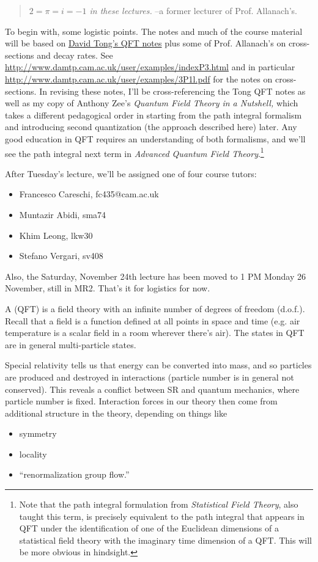 \begin{quote}\textit{$2=\pi=i=-1$ in these lectures.} --a former lecturer of Prof. Allanach's.\end{quote}
To begin with, some logistic points. The notes and much of the course material will be based on \href{http://www.damtp.cam.ac.uk/user/tong/qft/qft.pdf}{David Tong's QFT notes} plus some of Prof. Allanach's on cross-sections and decay rates. See \url{http://www.damtp.cam.ac.uk/user/examples/indexP3.html} and in particular \url{http://www.damtp.cam.ac.uk/user/examples/3P1l.pdf} for the notes on cross-sections. In revising these notes, I'll be cross-referencing the Tong QFT notes as well as my copy of Anthony Zee's \textit{Quantum Field Theory in a Nutshell,} which takes a different pedagogical order in starting from the path integral formalism and introducing second quantization (the approach described here) later. Any good education in QFT requires an understanding of both formalisms, and we'll see the path integral next term in \emph{Advanced Quantum Field Theory}.\footnote{Note that the path integral formulation from \emph{Statistical Field Theory}, also taught this term, is precisely equivalent to the path integral that appears in QFT under the identification of one of the Euclidean dimensions of a statistical field theory with the imaginary time dimension of a QFT. This will be more obvious in hindsight.}

After Tuesday's lecture, we'll be assigned one of four course tutors:
\begin{itemize}
    \item Francesco Careschi, fc435@cam.ac.uk
    \item Muntazir Abidi, sma74
    \item Khim Leong, lkw30
    \item Stefano Vergari, sv408
\end{itemize}
Also, the Saturday, November 24th lecture has been moved to 1 PM Monday 26 November, still in MR2. That's it for logistics for now.

\begin{defn}
A  (QFT) is a field theory with an infinite number of degrees of freedom (d.o.f.). Recall that a field is a function defined at all points in space and time (e.g. air temperature is a scalar field in a room wherever there's air). The states in QFT are in general multi-particle states.
\end{defn}
Special relativity tells us that energy can be converted into mass, and so particles are produced and destroyed in interactions (particle number is in general not conserved). This reveals a conflict between SR and quantum mechanics, where particle number is fixed. Interaction forces in our theory then come from additional structure in the theory, depending on things like
\begin{itemize}
    \item symmetry
    \item locality
    \item ``renormalization group flow.''
\end{itemize}

